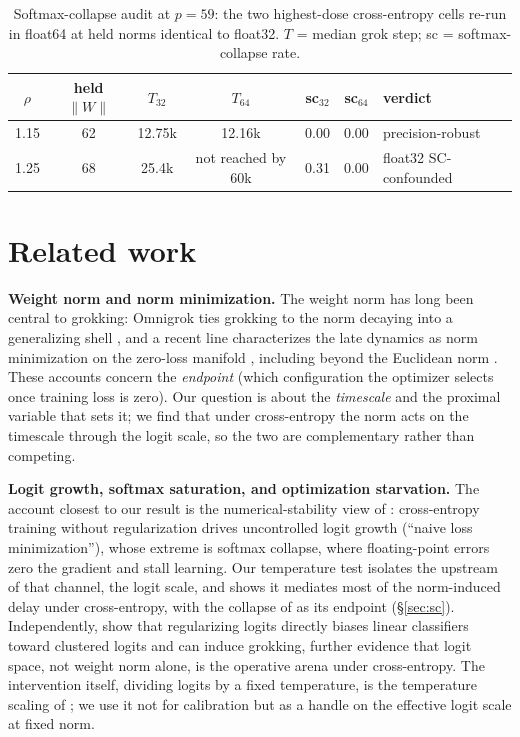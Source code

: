 \begin{table}[h]\centering\small
\caption{Softmax-collapse audit at $p=59$: the two highest-dose cross-entropy cells re-run in float64 at
held norms identical to float32. $T$ = median grok step; sc = softmax-collapse rate.}
\label{tab:sc}
\begin{tabular}{ccccccl}
\toprule
$\rho$ & held $\|W\|$ & $T_{32}$ & $T_{64}$ & sc$_{32}$ & sc$_{64}$ & verdict \\
\midrule
1.15 & 62 & 12.75k & 12.16k & 0.00 & 0.00 & precision-robust \\
1.25 & 68 & 25.4k & not reached by 60k & 0.31 & 0.00 & float32 SC-confounded \\
\bottomrule
\end{tabular}
\end{table}

\section{Related work}

\textbf{Weight norm and norm minimization.} The weight norm has long been central to grokking: Omnigrok
ties grokking to the norm decaying into a generalizing shell \citep{liu2023omnigrok}, and a recent line
characterizes the late dynamics as norm minimization on the zero-loss manifold
\citep{musat2025geometry,boursier2025framework}, including beyond the Euclidean norm
\citep{notsawo2025beyond}. These accounts concern the \emph{endpoint} (which configuration the optimizer
selects once training loss is zero). Our question is about the \emph{timescale} and the proximal variable
that sets it; we find that under cross-entropy the norm acts on the timescale through the logit scale, so
the two are complementary rather than competing.

\textbf{Logit growth, softmax saturation, and optimization starvation.} The account closest to our result
is the numerical-stability view of \citet{prieto2025grokking}: cross-entropy training without
regularization drives uncontrolled logit growth (``naive loss minimization''), whose extreme is softmax
collapse, where floating-point errors zero the gradient and stall learning. Our temperature test isolates
the upstream of that channel, the logit scale, and shows it mediates most of the norm-induced delay under
cross-entropy, with the collapse of \citet{prieto2025grokking} as its endpoint (\S\ref{sec:sc}).
Independently, \citet{beck2026logit} show that regularizing logits directly biases linear classifiers
toward clustered logits and can induce grokking, further evidence that logit space, not weight norm alone,
is the operative arena under cross-entropy. The intervention itself, dividing logits by a fixed
temperature, is the temperature scaling of \citet{guo2017calibration}; we use it not for calibration but as
a handle on the effective logit scale at fixed norm.

